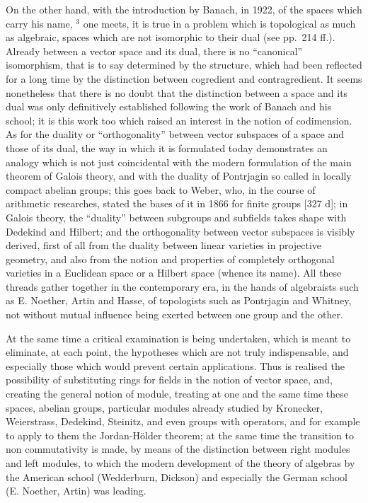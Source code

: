 On the other hand, with the introduction by Banach, in 1922, of the spaces which carry his name, \(^{3}\) one meets, it is true in a problem which is topological as much as algebraic, spaces which are not isomorphic to their dual (see pp.~214 ff.). Already between a vector space and its dual, there is no ``canonical'' isomorphism, that is to say determined by the structure, which had been reflected for a long time by the distinction between cogredient and contragredient. It seems nonetheless that there is no doubt that the distinction between a space and its dual was only definitively established following the work of Banach and his school; it is this work too which raised an interest in the notion of codimension. As for the duality or ``orthogonality'' between vector subspaces of a space and those of its dual, the way in which it is formulated today demonstrates an analogy which is not just coincidental with the modern formulation of the main theorem of Galois theory, and with the duality of Pontrjagin so called in locally compact abelian groups; this goes back to Weber, who, in the course of arithmetic researches, stated the bases of it in 1866 for finite groups {[}327 d{]}; in Galois theory, the ``duality'' between subgroups and subfields takes shape with Dedekind and Hilbert; and the orthogonality between vector subspaces is visibly derived, first of all from the duality between linear varieties in projective geometry, and also from the notion and properties of completely orthogonal varieties in a Euclidean space or a Hilbert space (whence its name). All these threads gather together in the contemporary era, in the hands of algebraists such as E. Noether, Artin and Hasse, of topologists such as Pontrjagin and Whitney, not without mutual influence being exerted between one group and the other.

At the same time a critical examination is being undertaken, which is meant to eliminate, at each point, the hypotheses which are not truly indispensable, and especially those which would prevent certain applications. Thus is realised the possibility of substituting rings for fields in the notion of vector space, and, creating the general notion of module, treating at one and the same time these spaces, abelian groups, particular modules already studied by Kronecker, Weierstrass, Dedekind, Steinitz, and even groups with operators, and for example to apply to them the Jordan-Hölder theorem; at the same time the transition to non commutativity is made, by means of the distinction between right modules and left modules, to which the modern development of the theory of algebras by the American school (Wedderburn, Dickson) and especially the German school (E. Noether, Artin) was leading.

